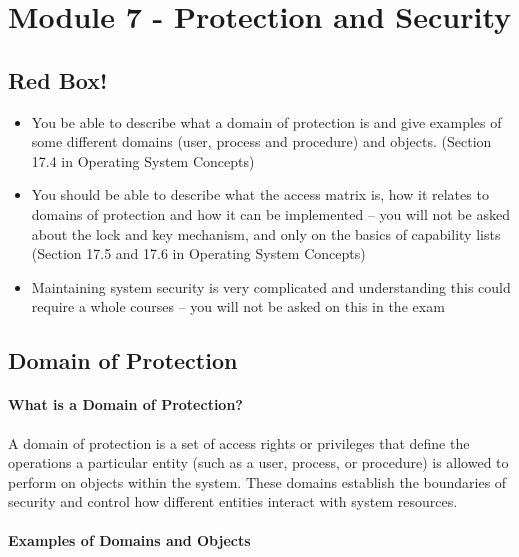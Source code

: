 \section{Module 7 - Protection and Security}
\subsection{Red Box!}
\begin{itemize}
    \item You be able to describe what a domain of protection is and give examples of some
    different domains (user, process and procedure) and
    objects. (Section 17.4 in Operating System Concepts)
    \item You should be able to describe what the access matrix is, how it relates to domains of protection and how it can be implemented – you will not be asked about
    the lock and key mechanism, and only on the basics of capability lists (Section 17.5 and 17.6 in Operating System Concepts)
    \item Maintaining system security is very complicated and understanding this could require a whole courses – you will
    not be asked on this in the exam
\end{itemize}

\subsection{Domain of Protection}

\paragraph{What is a Domain of Protection?}
A domain of protection is a set of access rights or privileges that define the operations a particular entity (such as a user, process, or procedure) is allowed to perform on objects within the system. These domains establish the boundaries of security and control how different entities interact with system resources.

\paragraph{Examples of Domains and Objects}

